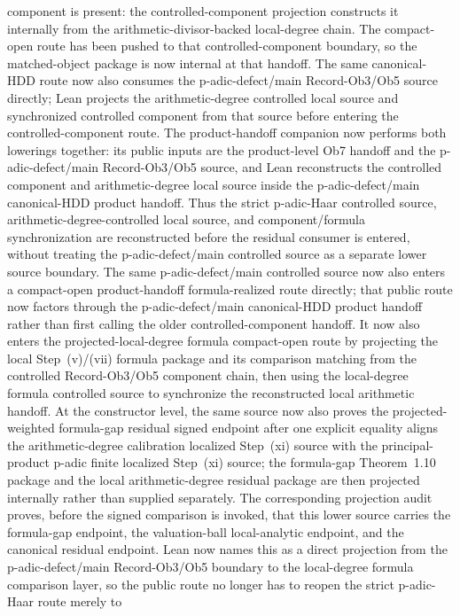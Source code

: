 \documentclass[11pt]{article}
\theoremstyle{plain}
\theoremstyle{definition}
\theoremstyle{remark}
\begin{document}
component is present: the controlled-component projection constructs it
internally from the arithmetic-divisor-backed local-degree chain.
The compact-open route has been pushed to that controlled-component boundary,
so the matched-object package is now internal at that handoff.
The same canonical-HDD route now also consumes the p-adic-defect/main
Record-Ob3/Ob5 source directly; Lean projects the arithmetic-degree controlled
local source and synchronized controlled component from that source before
entering the controlled-component route.
The product-handoff companion now performs both lowerings together: its public
inputs are the product-level Ob7 handoff and the p-adic-defect/main
Record-Ob3/Ob5 source, and Lean reconstructs the controlled component and
arithmetic-degree local source inside the p-adic-defect/main canonical-HDD
product handoff.
Thus the strict
p-adic-Haar controlled source, arithmetic-degree-controlled local source, and
component/formula synchronization are reconstructed before the residual consumer
is entered, without treating the p-adic-defect/main controlled source as a
separate lower source boundary.  The same p-adic-defect/main controlled source
now also enters a compact-open product-handoff formula-realized route directly;
that public route now factors through the p-adic-defect/main canonical-HDD
product handoff rather than first calling the older controlled-component
handoff.  It now
also enters the projected-local-degree formula compact-open route by projecting
the local Step~(v)/(vii) formula package and its comparison matching from the
controlled Record-Ob3/Ob5 component chain, then using the local-degree formula
controlled source to synchronize the reconstructed local arithmetic handoff.
At the constructor level, the same source now also proves the projected-weighted
formula-gap residual signed endpoint after one explicit equality aligns the
arithmetic-degree calibration localized Step~(xi) source with the
principal-product p-adic finite localized Step~(xi) source; the formula-gap
Theorem~1.10 package and the local arithmetic-degree residual package are then
projected internally rather than supplied separately.
The corresponding projection audit proves, before the signed comparison is
invoked, that this lower source carries the formula-gap endpoint, the
valuation-ball local-analytic endpoint, and the canonical residual endpoint.
Lean now names this as a direct projection from the p-adic-defect/main
Record-Ob3/Ob5 boundary to the local-degree formula comparison layer, so the
public route no longer has to reopen the strict p-adic-Haar route merely to
\end{document}
